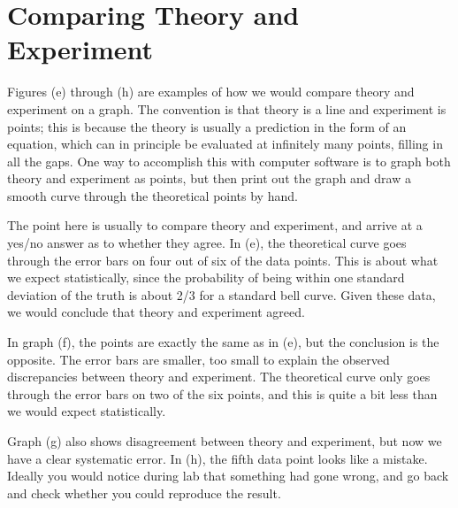 \section{Comparing Theory and Experiment}

Figures (e) through (h) are examples of how we would compare theory and experiment
on a graph. The convention is that theory is a line and experiment is points; this
is because the theory is usually a prediction in the form of an equation, which can
in principle be evaluated at infinitely many points, filling in all the gaps. One way
to accomplish this with computer software is to graph both theory and experiment as
points, but then print out the graph and draw a smooth curve through the theoretical
points by hand.


The point here is usually to compare theory and experiment, and arrive at a yes/no answer
as to whether they agree. In (e), the theoretical curve goes through
the error bars on four out of six of the data points. This is about what we expect statistically,
since the probability of being within one standard deviation of the truth is about
2/3 for a standard bell curve. Given these data, we would conclude that theory and experiment
agreed.

In graph (f), the points are exactly the same as in (e), but the conclusion is the opposite.
The error bars are smaller, too small to explain the observed discrepancies between theory
and experiment. The theoretical curve only goes through the error bars on two of the six
points, and this is quite a bit less than we would expect statistically.

Graph (g) also shows disagreement between theory and experiment, but now we have a clear systematic
error. 
In (h), the fifth data point looks like a mistake. Ideally you would notice during lab that
something had gone wrong, and go back and check whether you could reproduce the result.

